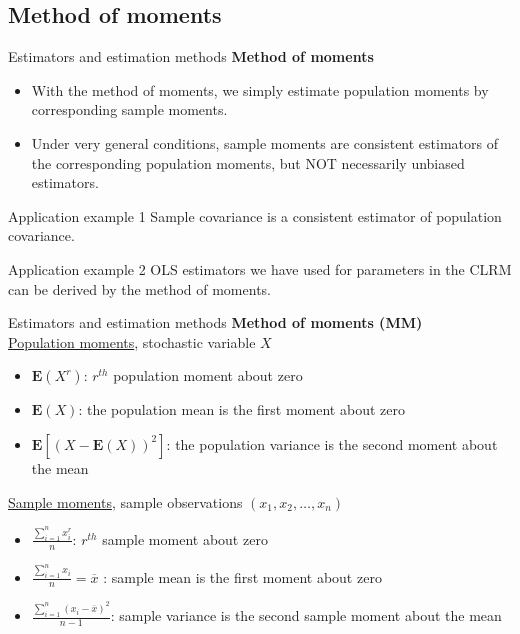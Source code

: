 \documentclass{beamer}
\begin{document}
\subsection{Method of moments}
\begin{frame}{Estimators and estimation methods}
\textbf{Method of moments}
\medskip
\begin{itemize}
\item With the method of moments, we simply estimate population moments by corresponding sample moments. 
\item Under very general conditions, sample moments are consistent estimators of the corresponding population moments, but NOT necessarily unbiased estimators.
\end{itemize}
\begin{block}{Application example 1}
Sample covariance is a consistent estimator of population covariance.
\end{block}
\begin{block}{Application example 2}
OLS estimators we have used for parameters in the CLRM can be derived by the method of moments. 
\end{block}
\end{frame}
\begin{frame}{Estimators and estimation methods}
\textbf{Method of moments (MM)}\\
\smallskip
\underline{Population moments}, stochastic variable $X$\\
\begin{itemize}
\item $\mathbf{E}(X^r)$: $r^{th}$ population moment about zero
\item $\mathbf{E}(X)$: the population mean is the first moment about zero
\item $\mathbf{E}[(X-\mathbf{E}(X))^2]$: the population variance is the second moment about the mean
\end{itemize}
\underline{Sample moments}, sample observations $(x_1, x_2, \dots,x_n)$
\begin{itemize}
\item $\frac{\sum_{i=1}^n x^r_i}{n}$: $r^{th}$ sample moment about zero
\item $\frac{\sum_{i=1}^n x_i}{n}=\overline{x} $ : sample mean is the first moment about zero
\item $\frac{\sum_{i=1}^n (x_i-\overline{x})^2}{n-1}$: sample variance is the second sample moment about the mean
\end{itemize}
\end{frame}
\end{document}
